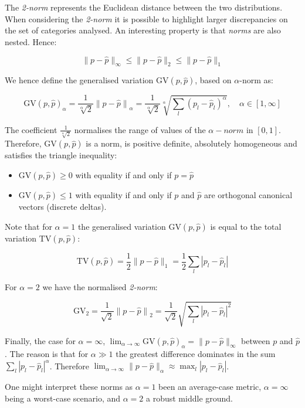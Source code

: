 The \emph{2-norm} represents the Euclidean distance between the two distributions. When considering the \emph{2-norm} it is possible to highlight larger discrepancies on the set of categories analysed. An interesting property is that \emph{norms} are also nested. Hence:

$$ \| p - \hat{p} \|_\infty \leqslant \| p - \hat{p} \|_2 \leqslant \| p - \hat{p} \|_1 $$

We hence define the generalised variation $\text{GV}(p, \hat{p})$, based on $\alpha$-norm as:

$$ \text{GV}(p, \hat{p})_\alpha = \frac {1} {\sqrt[\alpha]{2}}  {\| p - \hat{p} \|}_\alpha =  \frac {1} {\sqrt[\alpha]{2}} \sqrt[\alpha]{{ \sum_l{ ( p_{l} - \hat{p}_{l})^\alpha } }} ,\quad  \alpha \in [1,\infty]$$

The coefficient $\frac {1} {\sqrt[\alpha]{2}}$ normalises the range of values of the \emph{$\alpha-norm$} in $[0, 1]$. Therefore, $\text{GV}(p, \hat{p})$ is a norm, is positive definite, absolutely homogeneous and satisfies the triangle inequality:

\begin{itemize}
 \item $\text{GV}(p, \hat{p}) \geq 0 $ with equality if and only if $p = \hat{p}$
 \item $\text{GV}(p, \hat{p}) \leq 1$ with equality if and only if $p$ and $\hat{p}$ are orthogonal canonical vectors (discrete deltas).
\end{itemize}

Note that for $\alpha = 1$ the generalised variation $\text{GV}(p, \hat{p})$ is equal to the total variation $\text{TV}(p, \hat{p}) $:

$$ \text{TV}(p, \hat{p})= \frac {1} {2}  \| p - \hat{p} \|_1 =  \frac {1} {2} \sum_l{ | p_{l} - \hat{p}_{l} | } $$

For $\alpha = 2$ we have the normalised \emph{2-norm}:

$$ \text{GV}_2 = \frac {1} {\sqrt{2}}  {\| p - \hat{p} \|}_2 =  \frac {1} {\sqrt{2}} \sqrt{{ \sum_l{ | p_{l} - \hat{p}_{l}|^2 } }} $$

Finally, the case for $\alpha = \infty$, $\lim_{\alpha\to\infty} \text{GV}(p, \hat{p})_\alpha = \| p - \hat{p} \|_\infty $ between $p$ and $\hat{p}$. The reason is that for $\alpha \gg 1$ the greatest difference dominates in the sum $\sum_l{ {| p_l - \hat{p}_l |}^\alpha }$. Therefore $\lim_{\alpha\to\infty} \| p - \hat{p} \|_\alpha \approx \max_l { | p_l - \hat{p}_l | } $.

One might interpret these norms as $\alpha = 1$ been an average-case metric, $\alpha=\infty$ being a worst-case scenario, and $\alpha=2$ a robust middle ground.

